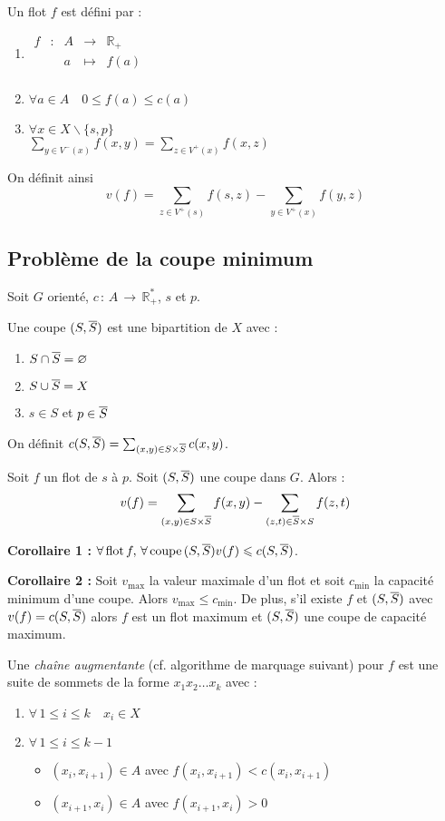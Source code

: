 \documentclass[a4paper, 8pt]{article}
\begin{document}
\begin{multicols*}{3}
Un flot $f$ est défini par : \begin{enumerate}
\item $
\begin{array}{cc|ccl} 
f & : & A & \to & \mathbb{R}_+  \\
 & & a & \mapsto & f(a)\\
\end{array}
$
\item $\forall a \in A\quad 0 \leqslant f(a) \leqslant c(a) $
\item $\forall x \in X\backslash\{s,p\}$\\ 
 $\displaystyle\sum_{y\in V^-(x)}{f(x,y)} = \sum_{z\in V^+(x)}{f(x,z)}$
\end{enumerate}

On définit ainsi
\[v(f) = \displaystyle\sum_{z\in V^+(s)}{f(s,z)} - \sum_{y\in V^+(x)}{f(y,z)} \]

\subsection*{Problème de la coupe minimum}
Soit $G$ orienté, $c\, :\, A\, \rightarrow\, \mathbb{R}^*_+$, $s$ et $p$.

Une coupe $(S,\overline{S})$ est une bipartition de $X$ avec :\begin{enumerate}
\item $S \cap \overline{S} = \varnothing$
\item $S \cup \overline{S} = X$
\item $s\in S$ et $p\in \overline{S}$
\end{enumerate}

On définit $c(S,\overline{S}) = \sum_{(x,y)\in S\times\overline{S}}{c(x,y)}$.

Soit $f$ un flot de $s$ à $p$. Soit $(S,\overline{S})$ une coupe dans $G$. Alors :
\[ \displaystyle v(f) = \sum_{(x,y)\in S\times\overline{S}}{f(x,y)} - \sum_{(z,t)\in \overline{S}\times S}{f(z,t)} \]

\textbf{Corollaire 1 :} $\forall\,\text{flot}\,f, \,\forall\,\text{coupe}\,(S,\overline{S})\\v(f) \leqslant c(S,\overline{S})$.

\textbf{Corollaire 2 :} Soit $v_{\text{max}}$ la valeur maximale d'un flot et soit $c_{\text{min}}$ la capacité minimum d'une coupe. Alors $v_{\text{max}} \leqslant c_{\text{min}}$. De plus, s'il existe $f$ et $(S,\overline{S})$ avec $v(f) = c(S,\overline{S})$ alors $f$ est un flot maximum et $(S,\overline{S})$ une coupe de capacité maximum.

Une \textit{chaîne augmentante} (cf. algorithme de marquage suivant) pour $f$ est une suite de sommets de la forme $x_1x_2\ldots x_k$ avec :
\begin{enumerate}
\item $\forall\, 1 \leqslant i \leqslant k\quad x_i \in X$
\item $\forall\, 1 \leqslant i \leqslant k-1$
	\begin{itemize}
	\item $(x_i,x_{i+1})\in A$ avec $f(x_i,x_{i+1}) < c(x_i,x_{i+1})$
	\item $(x_{i+1},x_i)\in A$ avec $f (x_{i+1},x_i) > 0$
	\end{itemize}
\end{enumerate}


\end{multicols*}
\end{document}
